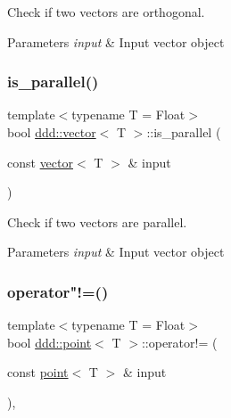 Check if two vectors are orthogonal. 


\begin{DoxyParams}{Parameters}
{\em input} & Input vector object \\
\hline
\end{DoxyParams}
\mbox{\label{classddd_1_1vector_a3f3fe85b03fcdfdd2a8002900d35d3a3}} 
\subsubsection{\texorpdfstring{is\+\_\+parallel()}{is\_parallel()}}
{\footnotesize\ttfamily template$<$typename T = Float$>$ \\
bool \hyperlink{classddd_1_1vector}{ddd\+::vector}$<$ T $>$\+::is\+\_\+parallel (\begin{DoxyParamCaption}\item[{const \hyperlink{classddd_1_1vector}{vector}$<$ T $>$ \&}]{input }\end{DoxyParamCaption})\hspace{0.3cm}{\ttfamily [inline]}}



Check if two vectors are parallel. 


\begin{DoxyParams}{Parameters}
{\em input} & Input vector object \\
\hline
\end{DoxyParams}
\mbox{\label{classddd_1_1point_a2567b8c3cd08d965e70033f3f4a8d3db}} 
\subsubsection{\texorpdfstring{operator"!=()}{operator!=()}\hspace{0.1cm}{\footnotesize\ttfamily [1/2]}}
{\footnotesize\ttfamily template$<$typename T = Float$>$ \\
bool \hyperlink{classddd_1_1point}{ddd\+::point}$<$ T $>$\+::operator!= (\begin{DoxyParamCaption}\item[{const \hyperlink{classddd_1_1point}{point}$<$ T $>$ \&}]{input }\end{DoxyParamCaption})\hspace{0.3cm}{\ttfamily [inline]}, {\ttfamily [inherited]}}



